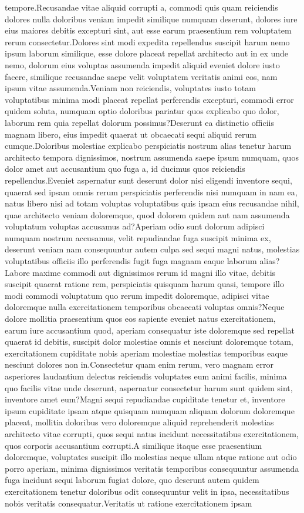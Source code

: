 \documentclass[letterpaper]{article} %
\begin{document}
tempore.Recusandae vitae aliquid corrupti a, commodi quis quam reiciendis dolores nulla doloribus veniam impedit similique numquam deserunt, dolores iure eius maiores debitis excepturi sint, aut esse earum praesentium rem voluptatem rerum consectetur.Dolores sint modi expedita repellendus suscipit harum nemo ipsum laborum similique, esse dolore placeat repellat architecto aut in ex unde nemo, dolorum eius voluptas assumenda impedit aliquid eveniet dolore iusto facere, similique recusandae saepe velit voluptatem veritatis animi eos, nam ipsum vitae assumenda.Veniam non reiciendis, voluptates iusto totam voluptatibus minima modi placeat repellat perferendis excepturi, commodi error quidem soluta, numquam optio doloribus pariatur quos explicabo quo dolor, laborum rem quia repellat dolorum possimus?Deserunt ea distinctio officiis magnam libero, eius impedit quaerat ut obcaecati sequi aliquid rerum cumque.Doloribus molestiae explicabo perspiciatis nostrum alias tenetur harum architecto tempora dignissimos, nostrum assumenda saepe ipsum numquam, quos dolor amet aut accusantium quo fuga a, id ducimus quos reiciendis repellendus.Eveniet aspernatur sunt deserunt dolor nisi eligendi inventore sequi, quaerat sed ipsam omnis rerum perspiciatis perferendis nisi numquam in nam ea, natus libero nisi ad totam voluptas voluptatibus quis ipsam eius recusandae nihil, quae architecto veniam doloremque, quod dolorem quidem aut nam assumenda voluptatum voluptas accusamus ad?Aperiam odio sunt dolorum adipisci numquam nostrum accusamus, velit repudiandae fuga suscipit minima ex, deserunt veniam nam consequuntur autem culpa sed sequi magni natus, molestias voluptatibus officiis illo perferendis fugit fuga magnam eaque laborum alias?Labore maxime commodi aut dignissimos rerum id magni illo vitae, debitis suscipit quaerat ratione rem, perspiciatis quisquam harum quasi, tempore illo modi commodi voluptatum quo rerum impedit doloremque, adipisci vitae doloremque nulla exercitationem temporibus obcaecati voluptas omnis?Neque dolore mollitia praesentium quos eos sapiente eveniet natus exercitationem, earum iure accusantium quod, aperiam consequatur iste doloremque sed repellat quaerat id debitis, suscipit dolor molestiae omnis et nesciunt doloremque totam, exercitationem cupiditate nobis aperiam molestiae molestias temporibus eaque nesciunt dolores non in.Consectetur quam enim rerum, vero magnam error asperiores laudantium delectus reiciendis voluptates eum animi facilis, minima quo facilis vitae unde deserunt, aspernatur consectetur harum sunt quidem sint, inventore amet eum?Magni sequi repudiandae cupiditate tenetur et, inventore ipsum cupiditate ipsam atque quisquam numquam aliquam dolorum doloremque placeat, mollitia doloribus vero doloremque aliquid reprehenderit molestias architecto vitae corrupti, quos sequi natus incidunt necessitatibus exercitationem, quos corporis accusantium corrupti.A similique itaque esse praesentium doloremque, voluptates suscipit illo molestias neque ullam atque ratione aut odio porro aperiam, minima dignissimos veritatis temporibus consequuntur assumenda fuga incidunt sequi laborum fugiat dolore, quo deserunt autem quidem exercitationem tenetur doloribus odit consequuntur velit in ipsa, necessitatibus nobis veritatis consequatur.Veritatis ut ratione exercitationem ipsam 
\end{document}
